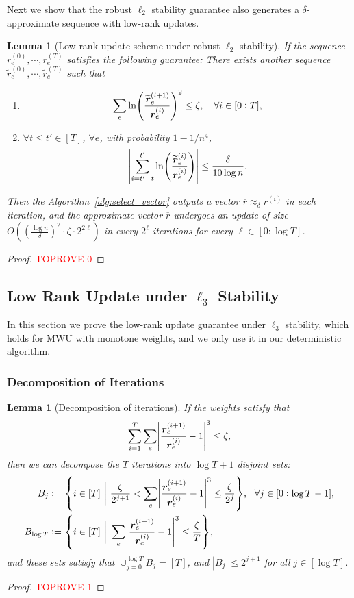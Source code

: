 \documentclass[11pt]{article}
\newtheorem{lemma}[theorem]{Lemma}
\let\originalleft\left
\let\originalright\right
\renewcommand{\left}{\mathopen{}\mathclose\bgroup\originalleft}
\renewcommand{\right}{\aftergroup\egroup\originalright}
\newcommand\rr{\boldsymbol{\mathit{r}}}
\newcommand{\wt}{\widetilde}
\newcommand{\ov}{\overline}
\begin{document}
Next we show that the robust $\ell_2$ stability guarantee also generates a $\delta$-approximate sequence with low-rank updates.
\begin{lemma}[Low-rank update scheme under robust $\ell_2$ stability]\label{lem:LowRankL2Robust}
If the sequence $\rr_e^{(0)}, \cdots, \rr_e^{(T)}$ satisfies the following guarantee: There exists another sequence $\wt{\rr}_e^{(0)}, \cdots, \wt{\rr}_e^{(T)}$ such that
\begin{enumerate}
    \item 
    \[
    \sum_e \ln\left(\frac{\wt{\rr}_e^{(i+1)}}{\rr_e^{(i)}}\right)^2 \leq \zeta, ~~~ \forall i \in [0:T], 
    \]
    \item $\forall t \leq t' \in [T]$, $\forall e$, with probability $1 - 1/n^4$,
    \[
    \left|\sum_{i = t'-t}^{t'} \ln\left(\frac{\wt{\rr}_e^{(i)}}{\rr_e^{(i)}}\right)\right| \leq \frac{\delta}{10 \log n}. 
    \]
\end{enumerate}
Then the Algorithm~\ref{alg:select_vector} outputs a vector $\ov{\rr} \approx_{\delta} \rr^{(i)}$ in each iteration, and the approximate vector $\ov{\rr}$ undergoes an update of size $O((\frac{\log n}{\delta})^2 \cdot \zeta \cdot 2^{2\ell})$ in every $2^\ell$ iterations for every $\ell \in [0:\log T]$.
\end{lemma}
\begin{proof}\textcolor{red}{TOPROVE 0}\end{proof}



\subsection{Low Rank Update under \texorpdfstring{$\ell_3$}{} Stability}
In this section we prove the low-rank update guarantee under $\ell_3$ stability, which holds for MWU with monotone weights, and we only use it in our deterministic algorithm.
\subsubsection{Decomposition of Iterations}
\begin{lemma}[Decomposition of iterations]\label{lem:decomposition_iteration}
If the weights satisfy that 
\[
\sum_{i=1}^T \sum_{e} \left|\frac{\rr_e^{\left(i + 1\right)}}{\rr_e^{\left(i \right)}} - 1 \right|^3 \leq \zeta,
\]
then we can decompose the $T$ iterations into $\log T + 1$ disjoint sets:
\begin{align*}
B_j := &~ \left\{ i \in [T] ~\bigg|~ \frac{\zeta}{2^{j+1}} < \sum_{e} \left|\frac{\rr_e^{\left(i + 1\right)}}{\rr_e^{\left(i \right)}} - 1 \right|^3 \leq \frac{\zeta}{2^{j}} \right\},~~ \forall j \in [0:\log T-1], \\
B_{\log T} := &~ \left\{ i \in [T] ~\bigg|~ \sum_{e} \left|\frac{\rr_e^{\left(i + 1\right)}}{\rr_e^{\left(i \right)}} - 1 \right|^3 \leq \frac{\zeta}{T} \right\},
\end{align*}
and these sets satisfy that $\cup_{j=0}^{\log T} B_j = [T]$, and $|B_j| \leq 2^{j+1}$ for all $j \in [\log T]$.
\end{lemma}
\begin{proof}\textcolor{red}{TOPROVE 1}\end{proof}
\end{document}
